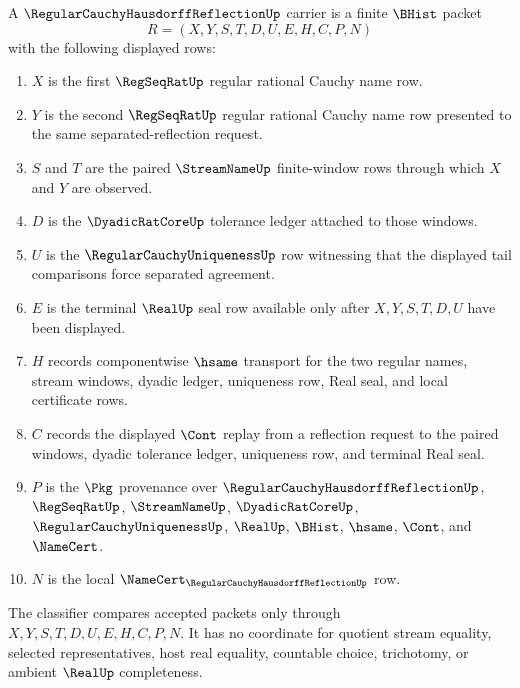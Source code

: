 \begin{definition}
\label{def:regular-cauchy-hausdorff-reflection-carrier}
A $\RegularCauchyHausdorffReflectionUp$ carrier is a finite $\BHist$ packet
$$
R=(X,Y,S,T,D,U,E,H,C,P,N)
$$
with the following displayed rows:
\begin{enumerate}
\item $X$ is the first $\RegSeqRatUp$ regular rational Cauchy name row.
\item $Y$ is the second $\RegSeqRatUp$ regular rational Cauchy name row presented to the same separated-reflection request.
\item $S$ and $T$ are the paired $\StreamNameUp$ finite-window rows through which $X$ and $Y$ are observed.
\item $D$ is the $\DyadicRatCoreUp$ tolerance ledger attached to those windows.
\item $U$ is the $\RegularCauchyUniquenessUp$ row witnessing that the displayed tail comparisons force separated agreement.
\item $E$ is the terminal $\RealUp$ seal row available only after $X,Y,S,T,D,U$ have been displayed.
\item $H$ records componentwise $\hsame$ transport for the two regular names, stream windows, dyadic ledger, uniqueness row, Real seal, and local certificate rows.
\item $C$ records the displayed $\Cont$ replay from a reflection request to the paired windows, dyadic tolerance ledger, uniqueness row, and terminal Real seal.
\item $P$ is the $\Pkg$ provenance over $\RegularCauchyHausdorffReflectionUp$, $\RegSeqRatUp$, $\StreamNameUp$, $\DyadicRatCoreUp$, $\RegularCauchyUniquenessUp$, $\RealUp$, $\BHist$, $\hsame$, $\Cont$, and $\NameCert$.
\item $N$ is the local $\NameCert_{\RegularCauchyHausdorffReflectionUp}$ row.
\end{enumerate}
The classifier compares accepted packets only through $X,Y,S,T,D,U,E,H,C,P,N$. It has no coordinate for quotient stream equality, selected representatives, host real equality, countable choice, trichotomy, or ambient $\RealUp$ completeness.
\end{definition}

